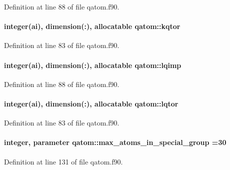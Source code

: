 Definition at line 88 of file qatom.\-f90.

\hypertarget{classqatom_a77756a8eee8ab11823bd3ac6f10153b8}{
\paragraph[{kqtor}]{\setlength{\rightskip}{0pt plus 5cm}integer(ai), dimension(\-:), allocatable qatom\-::kqtor}}\label{classqatom_a77756a8eee8ab11823bd3ac6f10153b8}


Definition at line 83 of file qatom.\-f90.

\hypertarget{classqatom_acf6c9a22703cc70e002c3b47528fa0a2}{
\paragraph[{lqimp}]{\setlength{\rightskip}{0pt plus 5cm}integer(ai), dimension(\-:), allocatable qatom\-::lqimp}}\label{classqatom_acf6c9a22703cc70e002c3b47528fa0a2}


Definition at line 88 of file qatom.\-f90.

\hypertarget{classqatom_a6c4163a7d53e88f2062f1f52f7641e15}{
\paragraph[{lqtor}]{\setlength{\rightskip}{0pt plus 5cm}integer(ai), dimension(\-:), allocatable qatom\-::lqtor}}\label{classqatom_a6c4163a7d53e88f2062f1f52f7641e15}


Definition at line 83 of file qatom.\-f90.

\hypertarget{classqatom_a6c96fd8bffab81fc806521b1099447d7}{
\paragraph[{max\-\_\-atoms\-\_\-in\-\_\-special\-\_\-group}]{\setlength{\rightskip}{0pt plus 5cm}integer, parameter qatom\-::max\-\_\-atoms\-\_\-in\-\_\-special\-\_\-group =30}}\label{classqatom_a6c96fd8bffab81fc806521b1099447d7}


Definition at line 131 of file qatom.\-f90.

